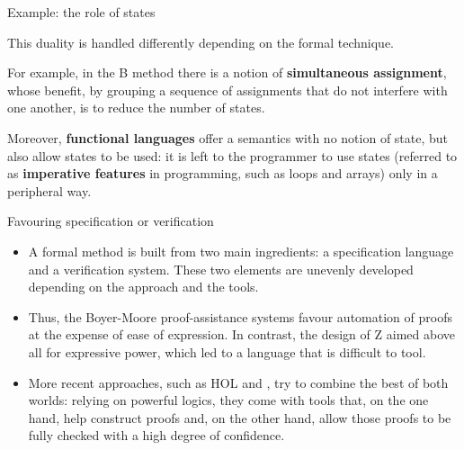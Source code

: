 \documentclass[compress,dvips,xcolor={dvipsnames},t]{beamer}
\begin{document}
%
\begin{frame}{Example: the role of states}

  This duality is handled differently depending on the formal
  technique.

  \bigskip

  For example, in the \textsf{B} method there is a notion of
  \textbf{simultaneous assignment}, whose benefit, by grouping a
  sequence of assignments that do not interfere with one another, is
  to reduce the number of states.

  \bigskip

  Moreover, \textbf{functional languages} offer a semantics with no
  notion of state, but also allow states to be used: it is left to the
  programmer to use states (referred to as \textbf{imperative
    features} in programming, such as loops and arrays) only in a
  peripheral way.

\end{frame}

%
\begin{frame}{Favouring specification or verification}
\begin{itemize}

  \item A formal method is built from two main ingredients: a
  specification language and a verification system. These two
  elements are unevenly developed depending on the approach and the
  tools.

  \item Thus, the Boyer-Moore proof-assistance systems favour
  automation of proofs at the expense of ease of expression. In
  contrast, the design of \textsf{Z} aimed above all for expressive
  power, which led to a language that is difficult to tool.

  \item More recent approaches, such as \textsf{HOL} and
  \Coq, try to combine the best of both worlds: relying on
  powerful logics, they come with tools that, on the one hand, help
  construct proofs and, on the other hand, allow those proofs to be
  fully checked with a high degree of confidence.

\end{itemize}

\end{frame}
\end{document}
